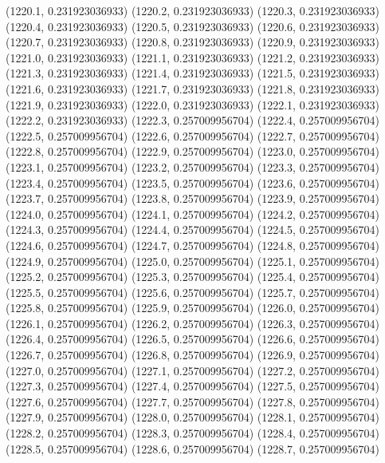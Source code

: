 {					(1220.1, 0.231923036933)
					(1220.2, 0.231923036933)
					(1220.3, 0.231923036933)
					(1220.4, 0.231923036933)
					(1220.5, 0.231923036933)
					(1220.6, 0.231923036933)
					(1220.7, 0.231923036933)
					(1220.8, 0.231923036933)
					(1220.9, 0.231923036933)
					(1221.0, 0.231923036933)
					(1221.1, 0.231923036933)
					(1221.2, 0.231923036933)
					(1221.3, 0.231923036933)
					(1221.4, 0.231923036933)
					(1221.5, 0.231923036933)
					(1221.6, 0.231923036933)
					(1221.7, 0.231923036933)
					(1221.8, 0.231923036933)
					(1221.9, 0.231923036933)
					(1222.0, 0.231923036933)
					(1222.1, 0.231923036933)
					(1222.2, 0.231923036933)
					(1222.3, 0.257009956704)
					(1222.4, 0.257009956704)
					(1222.5, 0.257009956704)
					(1222.6, 0.257009956704)
					(1222.7, 0.257009956704)
					(1222.8, 0.257009956704)
					(1222.9, 0.257009956704)
					(1223.0, 0.257009956704)
					(1223.1, 0.257009956704)
					(1223.2, 0.257009956704)
					(1223.3, 0.257009956704)
					(1223.4, 0.257009956704)
					(1223.5, 0.257009956704)
					(1223.6, 0.257009956704)
					(1223.7, 0.257009956704)
					(1223.8, 0.257009956704)
					(1223.9, 0.257009956704)
					(1224.0, 0.257009956704)
					(1224.1, 0.257009956704)
					(1224.2, 0.257009956704)
					(1224.3, 0.257009956704)
					(1224.4, 0.257009956704)
					(1224.5, 0.257009956704)
					(1224.6, 0.257009956704)
					(1224.7, 0.257009956704)
					(1224.8, 0.257009956704)
					(1224.9, 0.257009956704)
					(1225.0, 0.257009956704)
					(1225.1, 0.257009956704)
					(1225.2, 0.257009956704)
					(1225.3, 0.257009956704)
					(1225.4, 0.257009956704)
					(1225.5, 0.257009956704)
					(1225.6, 0.257009956704)
					(1225.7, 0.257009956704)
					(1225.8, 0.257009956704)
					(1225.9, 0.257009956704)
					(1226.0, 0.257009956704)
					(1226.1, 0.257009956704)
					(1226.2, 0.257009956704)
					(1226.3, 0.257009956704)
					(1226.4, 0.257009956704)
					(1226.5, 0.257009956704)
					(1226.6, 0.257009956704)
					(1226.7, 0.257009956704)
					(1226.8, 0.257009956704)
					(1226.9, 0.257009956704)
					(1227.0, 0.257009956704)
					(1227.1, 0.257009956704)
					(1227.2, 0.257009956704)
					(1227.3, 0.257009956704)
					(1227.4, 0.257009956704)
					(1227.5, 0.257009956704)
					(1227.6, 0.257009956704)
					(1227.7, 0.257009956704)
					(1227.8, 0.257009956704)
					(1227.9, 0.257009956704)
					(1228.0, 0.257009956704)
					(1228.1, 0.257009956704)
					(1228.2, 0.257009956704)
					(1228.3, 0.257009956704)
					(1228.4, 0.257009956704)
					(1228.5, 0.257009956704)
					(1228.6, 0.257009956704)
					(1228.7, 0.257009956704)
}
